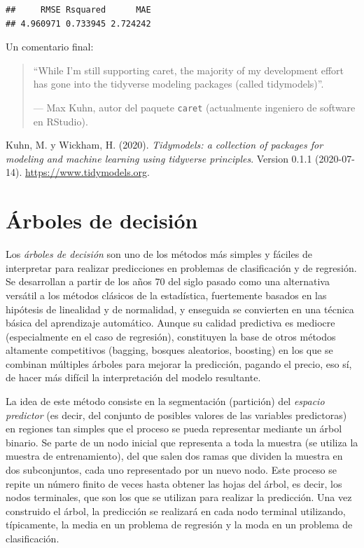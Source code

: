 \documentclass[]{book}
\newenvironment{Shaded}{\begin{snugshade}}{\end{snugshade}}
\newcommand{\KeywordTok}[1]{\textcolor[rgb]{0.13,0.29,0.53}{\textbf{#1}}}
\newcommand{\DataTypeTok}[1]{\textcolor[rgb]{0.13,0.29,0.53}{#1}}
\newcommand{\CommentTok}[1]{\textcolor[rgb]{0.56,0.35,0.01}{\textit{#1}}}
\newcommand{\OperatorTok}[1]{\textcolor[rgb]{0.81,0.36,0.00}{\textbf{#1}}}
\newcommand{\NormalTok}[1]{#1}
\theoremstyle{break}
\theoremstyle{definition}
\theoremstyle{definition}
\theoremstyle{definition}
\theoremstyle{remark}
\begin{document}
\begin{Shaded}
\end{Shaded}

\begin{verbatim}
##     RMSE Rsquared      MAE 
## 4.960971 0.733945 2.724242
\end{verbatim}

Un comentario final:

\begin{quote}
``While I'm still supporting caret, the majority of my development
effort has gone into the tidyverse modeling packages (called
tidymodels)''.

--- Max Kuhn, autor del paquete \texttt{caret} (actualmente ingeniero de
software en RStudio).
\end{quote}

Kuhn, M. y Wickham, H. (2020). \emph{Tidymodels: a collection of
packages for modeling and machine learning using tidyverse principles}.
Version 0.1.1 (2020-07-14). \url{https://www.tidymodels.org}.

\chapter{Árboles de decisión}\label{trees}

Los \emph{árboles de decisión} son uno de los métodos más simples y
fáciles de interpretar para realizar predicciones en problemas de
clasificación y de regresión. Se desarrollan a partir de los años 70 del
siglo pasado como una alternativa versátil a los métodos clásicos de la
estadística, fuertemente basados en las hipótesis de linealidad y de
normalidad, y enseguida se convierten en una técnica básica del
aprendizaje automático. Aunque su calidad predictiva es mediocre
(especialmente en el caso de regresión), constituyen la base de otros
métodos altamente competitivos (bagging, bosques aleatorios, boosting)
en los que se combinan múltiples árboles para mejorar la predicción,
pagando el precio, eso sí, de hacer más difícil la interpretación del
modelo resultante.

La idea de este método consiste en la segmentación (partición) del
\emph{espacio predictor} (es decir, del conjunto de posibles valores de
las variables predictoras) en regiones tan simples que el proceso se
pueda representar mediante un árbol binario. Se parte de un nodo inicial
que representa a toda la muestra (se utiliza la muestra de
entrenamiento), del que salen dos ramas que dividen la muestra en dos
subconjuntos, cada uno representado por un nuevo nodo. Este proceso se
repite un número finito de veces hasta obtener las hojas del árbol, es
decir, los nodos terminales, que son los que se utilizan para realizar
la predicción. Una vez construido el árbol, la predicción se realizará
en cada nodo terminal utilizando, típicamente, la media en un problema
de regresión y la moda en un problema de clasificación.
\end{document}
